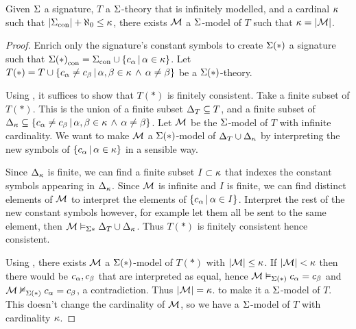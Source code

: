 \begin{prop}
    Given $\Sigma$ a signature, 
    $T$ a $\Sigma$-theory that is infinitely modelled,
    and a cardinal $\kappa$ such that $|{\Sigma}_\mathrm{con}| + \aleph_0 \leq \kappa$, 
    there exists $\mathcal{M}$ a $\Sigma$-model of $T$ such that 
    $\kappa = |{\mathcal{M}}|$.
\end{prop}
\begin{proof}
    Enrich only the signature's constant symbols to create $\Sigma(*)$ 
    a signature such that 
    ${\Sigma(*)}_\mathrm{con} = {\Sigma}_\mathrm{con} \cup \left\{c_\alpha \,|\, \alpha \in \kappa\right\}$.
    Let $T(*) = T \cup \left\{c_\alpha \neq c_\beta \,|\, \alpha,\beta \in \kappa \, \land \, \alpha \ne \beta\right\}$
    be a $\Sigma(*)$-theory.
    
    Using , 
    it suffices to show that $T(*)$ is finitely consistent.
    Take a finite subset of $T(*)$. 
    This is the union of a finite subset $\Delta_T \subseteq T$, 
    and a finite subset of 
    $\Delta_{\kappa} \subseteq 
    \left\{c_\alpha \neq c_\beta \,|\, \alpha,\beta \in \kappa \, \land \, \alpha \ne \beta\right\}$.
    Let $\mathcal{M}$ be the $\Sigma$-model of $T$ with infinite cardinality.
    We want to make 
    $\mathcal{M}$ a ${\Sigma(*)}$-model of $\Delta_T \cup \Delta_\kappa$ 
    by interpreting the new symbols of $\left\{c_\alpha \,|\, \alpha \in \kappa\right\}$
    in a sensible way.
    
    Since $\Delta_\kappa$ is finite, 
    we can find a finite subset $I \subset \kappa$ 
    that indexes the constant symbols appearing in $\Delta_\kappa$. 
    Since $\mathcal{M}$ is infinite and $I$ is finite,
    we can find distinct elements of $\mathcal{M}$
    to interpret the elements of
    $\left\{c_\alpha \,|\, \alpha \in I\right\}$. 
    Interpret the rest of the new constant symbols however,
    for example let them all be sent to the same element,
    then $\mathcal{M} \vDash_{\Sigma*} \Delta_T \cup \Delta_\kappa$.
    Thus $T(*)$ is finitely consistent hence consistent.
    
    Using 
    ,
    there exists
    $\mathcal{M}$ a $\Sigma(*)$-model of $T(*)$ with $|{\mathcal{M}}|\leq \kappa$.
    If $|{\mathcal{M}}| < \kappa$ 
    then there would be $c_\alpha, c_\beta$ that are interpreted as equal,
    hence $\mathcal{M} \vDash_{\Sigma(*)} c_\alpha = c_\beta$ and $\mathcal{M} \nvDash_{\Sigma(*)} c_\alpha = c_\beta$, 
    a contradiction.
    Thus $|{\mathcal{M}}| = \kappa$.
    to make it a $\Sigma$-model of $T$.
    This doesn't change the cardinality of $\mathcal{M}$,
    so we have a $\Sigma$-model of $T$ with cardinality $\kappa$.
\end{proof}

